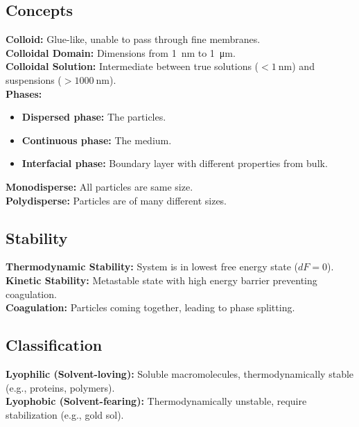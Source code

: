 \subsection{Concepts}
\textbf{Colloid:} Glue-like, unable to pass through fine membranes. \\
\textbf{Colloidal Domain:} Dimensions from \SI{1}{\nm} to \SI{1}{\micro\m}. \\
\textbf{Colloidal Solution:} Intermediate between true solutions ($< \SI{1}{\nm}$) and suspensions ($> \SI{1000}{\nm}$). \\
\textbf{Phases:}
\begin{itemize}
    \item \textbf{Dispersed phase:} The particles.
    \item \textbf{Continuous phase:} The medium.
    \item \textbf{Interfacial phase:} Boundary layer with different properties from bulk.
\end{itemize}
\textbf{Monodisperse:} All particles are same size. \\
\textbf{Polydisperse:} Particles are of many different sizes.

\subsection{Stability}
\textbf{Thermodynamic Stability:} System is in lowest free energy state ($dF=0$). \\
\textbf{Kinetic Stability:} Metastable state with high energy barrier preventing coagulation. \\
\textbf{Coagulation:} Particles coming together, leading to phase splitting.

\subsection{Classification}
\textbf{Lyophilic (Solvent-loving):} Soluble macromolecules, thermodynamically stable (e.g., proteins, polymers). \\
\textbf{Lyophobic (Solvent-fearing):} Thermodynamically unstable, require stabilization (e.g., gold sol).

